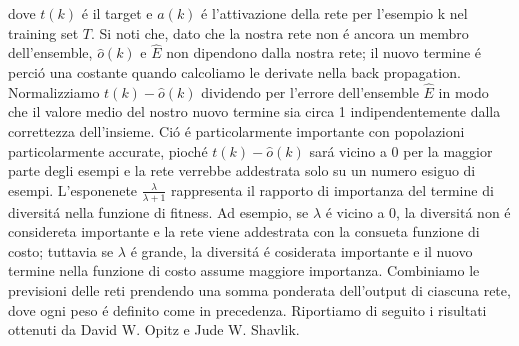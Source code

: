 \documentclass[a4paper,10pt]{article}
\begin{document}
  dove $t(k)$ \'e il target e $a(k)$ \'e l'attivazione della rete per l'esempio k nel training set $T$. Si noti che, dato che la nostra rete non \'e ancora un membro dell'ensemble, $\hat{o} (k)$ e $\hat{E}$ non dipendono dalla nostra rete; il nuovo termine \'e perci\'o una costante quando calcoliamo le derivate nella back propagation. Normalizziamo $t(k) - \hat{o} (k)$ dividendo per l'errore dell'ensemble $\hat{E}$ in modo che il valore medio del nostro nuovo termine sia circa 1 indipendentemente dalla correttezza dell'insieme. Ci\'o \'e particolarmente importante con popolazioni particolarmente accurate, pioch\'e $t(k) - \hat{o} (k)$ sar\'a vicino a 0 per la maggior parte degli esempi e la rete verrebbe addestrata solo su un numero esiguo di esempi. L'esponenete $\frac{\lambda}{\lambda + 1}$ rappresenta il rapporto di importanza del termine di diversit\'a nella funzione di fitness. Ad esempio, se $\lambda$ \'e vicino a 0, la diversit\'a non \'e considereta importante e la rete viene addestrata con la consueta funzione di costo; tuttavia se $\lambda$ \'e grande, la diversit\'a \'e cosiderata importante e il nuovo termine nella funzione di costo assume maggiore importanza. Combiniamo le previsioni delle reti prendendo una somma ponderata dell'output di ciascuna rete, dove ogni peso \'e definito come in precedenza. Riportiamo di seguito i risultati ottenuti da David W. Opitz e Jude W. Shavlik.
\end{document}

